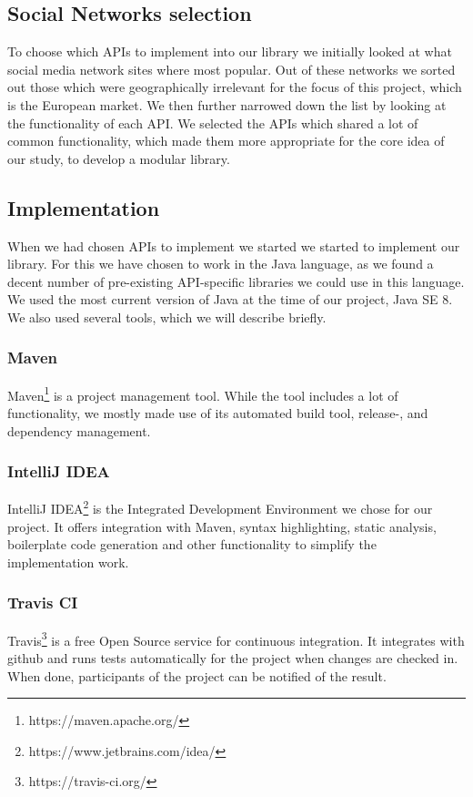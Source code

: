 \documentclass{sigchi-alternate}
\begin{document}
\subsection{Social Networks selection}
To choose which APIs to implement into our library we initially looked at what social media network sites where most popular\autocite{STATISTA_LEADING_SOCIAL_NETWORKS}.
Out of these networks we sorted out those which were geographically irrelevant for the focus of this project, which is the European market. We then further narrowed down
the list by looking at the functionality of each API. We selected the APIs which shared a lot of common functionality, which made them more appropriate for the core idea
of our study, to develop a modular library.

\subsection{Implementation}
When we had chosen APIs to implement we started we started to implement our library. For this we have chosen to work in the Java language, as we found a decent
number of pre-existing API-specific libraries we could use in this language. We used the most current version of Java at the time of our project, Java SE 8. We also used several
tools, which we will describe briefly.
\subsubsection{Maven}
Maven\footnote{https://maven.apache.org/} is a project management tool. While the tool includes a lot of functionality, we mostly made use of its automated build tool, release-, and
dependency management.
\subsubsection{IntelliJ IDEA}
IntelliJ IDEA\footnote{https://www.jetbrains.com/idea/} is the Integrated Development Environment we chose for our project. It offers integration with Maven, syntax highlighting,
static analysis, boilerplate code generation and other functionality to simplify the implementation work.
\subsubsection{Travis CI}
Travis\footnote{https://travis-ci.org/} is a free Open Source service for continuous integration. It integrates with github and runs tests automatically for the project when changes are
checked in. When done, participants of the project can be notified of the result.
\end{document}
